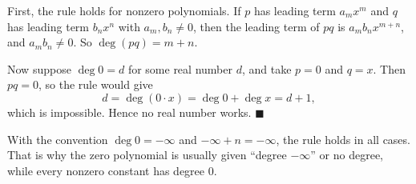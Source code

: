 First, the rule holds for nonzero polynomials. If $p$ has leading term $a_mx^m$ and $q$ has leading term $b_nx^n$ with $a_m,b_n\ne0$, then the leading term of $pq$ is $a_mb_nx^{m+n}$, and $a_mb_n\ne0$. So $\deg(pq)=m+n$.

Now suppose $\deg0=d$ for some real number $d$, and take $p=0$ and $q=x$. Then $pq=0$, so the rule would give
\[
d=\deg(0\cdot x)=\deg0+\deg x=d+1 ,
\]
which is impossible. Hence no real number works. $\blacksquare$

With the convention $\deg0=-\infty$ and $-\infty+n=-\infty$, the rule holds in all cases. That is why the zero polynomial is usually given ``degree $-\infty$'' or no degree, while every nonzero constant has degree $0$.
